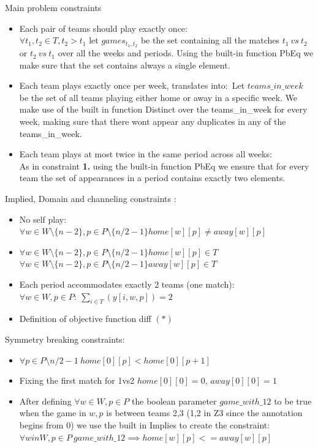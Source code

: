 \documentclass{article}
\begin{document}
Main problem constraints
\begin{itemize}
    \item [\textbf{1.}] Each pair of teams should play exactly once:\\
$\forall t_1,t_2 \in T, t_2>t_1$ let  $games_{t_1,t_2}$ be the set containing all the matches $t_1 \ vs \ t_2$ or $t_2 \ vs\  t_1$ over all the weeks and periods. Using the built-in function PbEq we make sure that the set contains always a single element.

\item [\textbf{2.}] Each team plays exactly once per week, translates into:\
Let $teams\_in\_week$ be the set of all teams playing either home or away in a specific week. We make use of the built in function Distinct over the teams\_in\_week for every week, making sure that there wont appear any duplicates in any of the teams\_in\_week.

\item [\textbf{3.}] Each team plays at most twice in the same period across all weeks:\\ 
As in constraint \textbf{1.} using the built-in function PbEq we ensure that for every team the set of appearances in a period contains exactly two elements.

\end{itemize}
Implied, Domain and channeling constraints :
\begin{itemize}
    \item[\textbf{4.}]No self play: $\forall w \in W\setminus\{n-2\}, p \in P\setminus\{n/2-1\} home[w][p] \neq away[w][p]$\\
    \item[\textbf{5.}] $\forall w \in W\setminus\{n-2\}, p \in P\setminus\{n/2-1\} home[w][p] \in T$\\
    $\forall w \in W\setminus\{n-2\}, p \in P\setminus\{n/2-1\} away[w][p] \in T$\\

\item[\textbf{6.}]Each period accommodates exactly 2 teams (one match):\\
$ \forall w \in W ,p \in P : \ \sum_{i \in T}(y[i,w,p])=2   $
\item[\textbf{7.}]Definition of  objective function diff $\mathbf{(*)}$ 

\end{itemize}
Symmetry breaking constraints:
\begin{itemize}
\item [\textbf{(sb2)}] $\forall p \in P\setminus{n/2-1}  \ home[0][p]< home[0][p+1] $
    \item [\textbf{(sb3)}]Fixing the first match for 1vs2 $home[0][0]=0$, $away[0][0]=1$

    \item [\textbf{(sb5)}] After defining $\forall w \in W, p \in P$ the boolean parameter $game\_with\_12$ to be true when the game in $w ,p$ is  between teams 2,3 (1,2 in Z3 since the annotation begins from 0) we use the built in Implies to create the constraint: 
    $\forall w in W, p \in P \  game\_with\_12 \implies home[w][p]<=away[w][p] $

\end{itemize}
\end{document}
